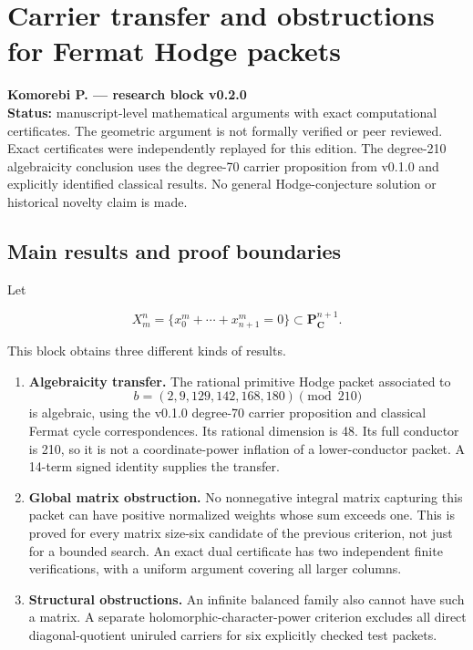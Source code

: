 \hypertarget{transfer210-carrier-transfer-and-obstructions-for-fermat-hodge-packets}{%
\chapter{Carrier transfer and obstructions for Fermat Hodge
packets}\label{transfer210-carrier-transfer-and-obstructions-for-fermat-hodge-packets}}

\textbf{Komorebi P. --- research block v0.2.0}\\
\textbf{Status:} manuscript-level mathematical arguments with exact
computational certificates. The geometric argument is not formally
verified or peer reviewed. Exact certificates were independently
replayed for this edition. The degree-210 algebraicity conclusion uses
the degree-70 carrier proposition from v0.1.0 and explicitly identified
classical results. No general Hodge-conjecture solution or historical
novelty claim is made.

\hypertarget{transfer210-main-results-and-proof-boundaries}{%
\section{Main results and proof
boundaries}\label{transfer210-main-results-and-proof-boundaries}}

Let

\[
X_m^n=\{x_0^m+\cdots+x_{n+1}^m=0\}\subset\mathbf P^{n+1}_{\mathbf C}.
\]

This block obtains three different kinds of results.

\begin{enumerate}
\def\labelenumi{\arabic{enumi}.}
\tightlist
\item
  \textbf{Algebraicity transfer.} The rational primitive Hodge packet
  associated to \[
  b=(2,9,129,142,168,180)\pmod {210}
  \] is algebraic, using the v0.1.0 degree-70 carrier proposition and
  classical Fermat cycle correspondences. Its rational dimension is 48.
  Its full conductor is 210, so it is not a coordinate-power inflation
  of a lower-conductor packet. A 14-term signed identity supplies the
  transfer.
\item
  \textbf{Global matrix obstruction.} No nonnegative integral matrix
  capturing this packet can have positive normalized weights whose sum
  exceeds one. This is proved for every matrix size-six candidate of the
  previous criterion, not just for a bounded search. An exact dual
  certificate has two independent finite verifications, with a uniform
  argument covering all larger columns.
\item
  \textbf{Structural obstructions.} An infinite balanced family also
  cannot have such a matrix. A separate holomorphic-character-power
  criterion excludes all direct diagonal-quotient uniruled carriers for
  six explicitly checked test packets.
\end{enumerate}

